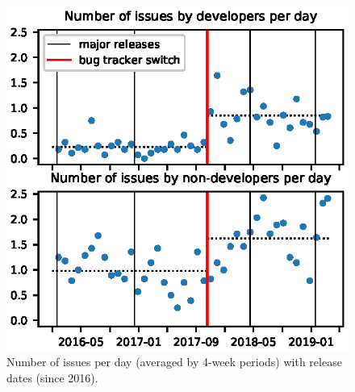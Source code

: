 \documentclass[conference]{IEEEtran}
\begin{document}
\begin{figure}
\includegraphics{bug_nb_with_releases.eps}
\caption{Number of issues per day (averaged by 4-week periods) with release dates (since 2016).} \label{bug_nb_with_releases}
\end{figure}

\end{document}
